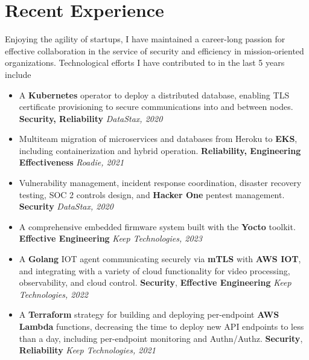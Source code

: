 \documentclass[letterpaper,10pt]{article}
\begin{document}
\section{Recent Experience}
Enjoying the agility of startups, I have maintained a career-long passion for
effective collaboration in the service of security and efficiency in
mission-oriented organizations. Technological efforts I have contributed to in the last 5 years include
\begin{itemize}
	\item A \textbf{Kubernetes} operator to deploy a distributed database, enabling TLS certificate provisioning to secure communications into and between nodes. \textbf{Security, Reliability} \textit{DataStax, 2020}
	\item Multiteam migration of microservices and databases from Heroku to \textbf{EKS}, including containerization and hybrid operation. \textbf{Reliability, Engineering Effectiveness} \textit{Roadie, 2021}
	\item Vulnerability management, incident response coordination, disaster recovery testing, SOC 2 controls design, and \textbf{Hacker One} pentest management. \textbf{Security} \textit{DataStax, 2020}
	      \setlength\itemsep{0.1em} \item A comprehensive embedded firmware system
	      built with the \textbf{Yocto} toolkit. \textbf{Effective Engineering} \textit{Keep Technologies, 2023}
	\item A \textbf{Golang} IOT agent communicating securely via \textbf{mTLS} with \textbf{AWS IOT}, and integrating with a variety of cloud functionality for video processing, observability, and cloud control. \textbf{Security}, \textbf{Effective Engineering} \textit{Keep Technologies, 2022}
	\item A \textbf{Terraform} strategy for building and deploying per-endpoint \textbf{AWS Lambda} functions, decreasing the time to deploy new API endpoints to less than a day, including per-endpoint monitoring and Authn/Authz. \textbf{Security}, \textbf{Reliability} \textit{Keep Technologies, 2021}
\end{itemize}
\end{document}
